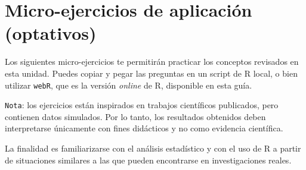 \documentclass[
  spanish,
  letterpaper,
  DIV=11,
  numbers=noendperiod]{scrreprt}
\begin{document}
\begin{tcolorbox}
\end{tcolorbox}

\section{Micro-ejercicios de aplicación
(optativos)}\label{micro-ejercicios-de-aplicaciuxf3n-optativos-1}

Los siguientes micro-ejercicios te permitirán practicar los conceptos
revisados en esta unidad. Puedes copiar y pegar las preguntas en un
script de R local, o bien utilizar \texttt{webR}, que es la versión
\emph{online} de R, disponible en esta guía.

\texttt{Nota}: los ejercicios están inspirados en trabajos científicos
publicados, pero contienen datos simulados. Por lo tanto, los resultados
obtenidos deben interpretarse únicamente con fines didácticos y no como
evidencia científica.

La finalidad es familiarizarse con el análisis estadístico y con el uso
de R a partir de situaciones similares a las que pueden encontrarse en
investigaciones reales.
\end{document}
